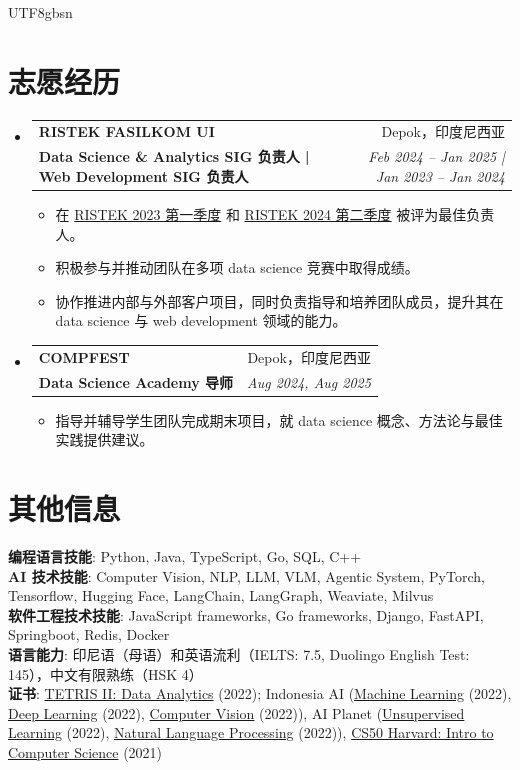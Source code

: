 \documentclass[letterpaper,10pt]{article}
\makeatletter
\newcommand{\resumeItem}[1]{
  \item\small{
    {#1 \vspace{0pt}}
  }
}
\newcommand{\resumeSubheading}[4]{
  \vspace{0pt}\item
    \begin{tabular*}{0.97\textwidth}[t]{l@{\extracolsep{\fill}}r}
      \textbf{\MakeUppercase{#1}} & #2 \\
      \textbf{\small#3} & \textit{\small #4} \\
    \end{tabular*}\vspace{0pt}
}
\newcommand{\resumeSubHeadingListStart}{\begin{itemize}[leftmargin=0.1in, label={}, itemsep=0pt, parsep=0pt]}
\newcommand{\resumeSubHeadingListEnd}{\end{itemize}}
\newcommand{\resumeItemListStart}{\begin{itemize}[itemsep=0pt, parsep=0pt, topsep=0pt]}
\newcommand{\resumeItemListEnd}{\end{itemize}\vspace{0pt}}
\makeatother
\begin{document}
\begin{CJK*}{UTF8}{gbsn}
	\section{志愿经历}
	\resumeSubHeadingListStart
	\resumeSubheading
	{RISTEK FASILKOM UI}{Depok，印度尼西亚}
	{Data Science \& Analytics SIG 负责人 | Web Development SIG 负责人}{Feb 2024 -- Jan 2025 | Jan 2023 -- Jan 2024}
	\resumeItemListStart
	\resumeItem{在 \href{https://drive.google.com/file/d/1pP1CsDuR71Rs0owoqqicpCiUmuYeMwdL/view}{RISTEK 2023 第一季度} 和 \href{https://drive.google.com/file/d/1JvAupLQcdfikTIEoBEY6xJRka4_q4eNk/view?usp=drive_link}{RISTEK 2024 第二季度} 被评为最佳负责人。}
	\resumeItem{积极参与并推动团队在多项 data science 竞赛中取得成绩。}
	\resumeItem{协作推进内部与外部客户项目，同时负责指导和培养团队成员，提升其在 data science 与 web development 领域的能力。}
	\resumeItemListEnd

	\resumeSubheading
	{COMPFEST}{Depok，印度尼西亚}
	{Data Science Academy 导师}{Aug 2024, Aug 2025}
	\resumeItemListStart
	\resumeItem{指导并辅导学生团队完成期末项目，就 data science 概念、方法论与最佳实践提供建议。}
	\resumeItemListEnd
	\resumeSubHeadingListEnd

	\section{其他信息}
	\begin{itemize}[leftmargin=0.15in, label={}]
		\small{\item{
		      \textbf{编程语言技能}{: Python, Java, TypeScript, Go, SQL, C++} \\
		      \textbf{AI 技术技能}{: Computer Vision, NLP, LLM, VLM, Agentic System, PyTorch, Tensorflow, Hugging Face, LangChain, LangGraph, Weaviate, Milvus} \\
		      \textbf{软件工程技术技能}{: JavaScript frameworks, Go frameworks, Django, FastAPI, Springboot, Redis, Docker} \\
		      \textbf{语言能力}{: 印尼语（母语）和英语流利（IELTS: 7.5, Duolingo English Test: 145），中文有限熟练（HSK 4）} \\
		      \textbf{证书}{: \href{https://drive.google.com/file/d/1LGxIU7f2DcPAavWGGb3w8n1sH5tmykkq/view?usp=drive_link}{TETRIS II: Data Analytics} (2022); Indonesia AI (\href{https://drive.google.com/file/d/1epVnzJAXUXkG0rDCY730wTkvqDTrKWmm/view?usp=drive_link}{Machine Learning} (2022), \href{https://drive.google.com/file/d/1hHk_ImBLJzZ2NknDrCkT3ZzIs6F4mi3m/view?usp=drive_link}{Deep Learning} (2022), \href{https://drive.google.com/file/d/1C72bTT8PYm3IHrJUUTycmnR05fLWO0an/view?usp=drive_link}{Computer Vision} (2022)), AI Planet (\href{https://drive.google.com/file/d/1ieVkydbAKMGE093SnktFL9BwapL9iu9G/view?usp=drive_link}{Unsupervised Learning} (2022), \href{https://drive.google.com/file/d/1-61Aa_cTMonVNvP91dcCp_PKp65HVTgn/view?usp=drive_link}{Natural Language Processing} (2022)), \href{https://drive.google.com/file/d/1Mjz63QF8Kiiy8I8GsrcZjDwXTZTmdueW/view?usp=drive_link}{CS50 Harvard: Intro to Computer Science} (2021)}
		      }}
	\end{itemize}

\end{CJK*}
\end{document}

